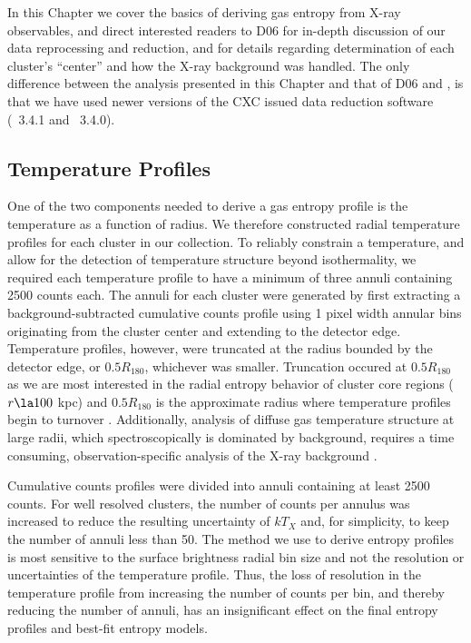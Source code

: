 In this Chapter we cover the basics of deriving gas entropy from X-ray
observables, and direct interested readers to D06 for in-depth
discussion of our data reprocessing and reduction, and
\citet{xrayband} for details regarding determination of each cluster's
``center'' and how the X-ray background was handled. The only
difference between the analysis presented in this Chapter and that of
D06 and \citet{xrayband}, is that we have used newer versions of the
CXC issued data reduction software (\ciao\ 3.4.1 and \caldb\ 3.4.0).

\subsection{Temperature Profiles}
\label{sec:entsupptemppr}

One of the two components needed to derive a gas entropy profile is
the temperature as a function of radius. We therefore constructed
radial temperature profiles for each cluster in our collection. To
reliably constrain a temperature, and allow for the detection of
temperature structure beyond isothermality, we required each
temperature profile to have a minimum of three annuli containing 2500
counts each. The annuli for each cluster were generated by first
extracting a background-subtracted cumulative counts profile using 1
pixel width annular bins originating from the cluster center and
extending to the detector edge. Temperature profiles, however, were
truncated at the radius bounded by the detector edge, or $0.5
R_{180}$, whichever was smaller. Truncation occured at $0.5 R_{180}$
as we are most interested in the radial entropy behavior of cluster
core regions ($r \la 100$ kpc) and $0.5 R_{180}$ is the approximate
radius where temperature profiles begin to turnover
\citep{2005ApJ...628..655V}.  Additionally, analysis of diffuse gas
temperature structure at large radii, which spectroscopically is
dominated by background, requires a time consuming,
observation-specific analysis of the X-ray background \cite[see][for a
  detailed discussion on this point]{minggroups}.

Cumulative counts profiles were divided into annuli containing at
least 2500 counts. For well resolved clusters, the number of counts
per annulus was increased to reduce the resulting uncertainty of
$kT_X$ and, for simplicity, to keep the number of annuli less than
50. The method we use to derive entropy profiles is most sensitive to
the surface brightness radial bin size and not the resolution or
uncertainties of the temperature profile. Thus, the loss of resolution
in the temperature profile from increasing the number of counts per
bin, and thereby reducing the number of annuli, has an insignificant
effect on the final entropy profiles and best-fit entropy models.

